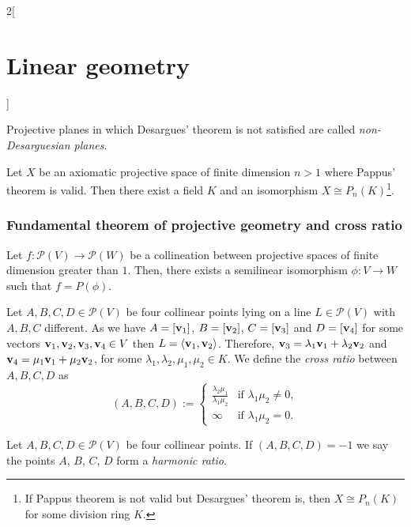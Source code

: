 \documentclass[../../../main_math.tex]{subfiles}
\begin{document}
\begin{multicols}{2}[\section{Linear geometry}]
\begin{definition}
\begin{itemize}
    \end{itemize}
  \end{definition}
  \begin{definition}
    Projective planes in which Desargues' theorem is not satisfied are called \emph{non-Desarguesian planes}.
  \end{definition}
  \begin{theorem}
    Let $X$ be an axiomatic projective space of finite dimension $n>1$ where Pappus' theorem is valid. Then there exist a field $K$ and an isomorphism $X\cong P_n(K)$\footnote{If Pappus theorem is not valid but Desargues' theorem is, then $X\cong P_n(K)$ for some division ring $K$.}.
  \end{theorem}
  \subsubsection{Fundamental theorem of projective geometry and cross ratio}
  \begin{theorem}
    Let $f:\mathcal{P}(V)\rightarrow \mathcal{P}(W)$ be a collineation between projective spaces of finite dimension greater than $1$. Then, there exists a semilinear isomorphism $\phi:V\rightarrow W$ such that $f=P(\phi)$.
  \end{theorem}
  \begin{definition}
    Let $A,B,C,D\in\mathcal{P}(V)$ be four collinear points lying on a line $L\in\mathcal{P}(V)$ with $A,B,C$ different. As we have $A=[\boldsymbol{\mathrm{v}}_1]$, $B=[\boldsymbol{\mathrm{v}}_2]$, $C=[\boldsymbol{\mathrm{v}}_3]$ and $D=[\boldsymbol{\mathrm{v}}_4]$ for some vectors $\boldsymbol{\mathrm{v}}_1,\boldsymbol{\mathrm{v}}_2,\boldsymbol{\mathrm{v}}_3,\boldsymbol{\mathrm{v}}_4\in V$ then $L=\langle \boldsymbol{\mathrm{v}}_1,\boldsymbol{\mathrm{v}}_2\rangle$. Therefore, $\boldsymbol{\mathrm{v}}_3=\lambda_1\boldsymbol{\mathrm{v}}_1+\lambda_2\boldsymbol{\mathrm{v}}_2$ and $\boldsymbol{\mathrm{v}}_4=\mu_1\boldsymbol{\mathrm{v}}_1+\mu_2\boldsymbol{\mathrm{v}}_2$, for some $\lambda_1,\lambda_2,\mu_1,\mu_2\in K$. We define the \emph{cross ratio} between $A,B,C,D$ as $$(A,B,C,D):=
      \begin{cases}
        \displaystyle\frac{\lambda_2\mu_1}{\lambda_1\mu_2} & \text{if }\lambda_1\mu_2\ne0, \\
        \infty                                             & \text{if }\lambda_1\mu_2=0.
      \end{cases}$$
  \end{definition}
  \begin{definition}
    Let $A,B,C,D\in\mathcal{P}(V)$ be four collinear points. If $(A,B,C,D)=-1$ we say the points $A$, $B$, $C$, $D$ form a \emph{harmonic ratio}.
  \end{definition}

\end{multicols}
\end{document}

